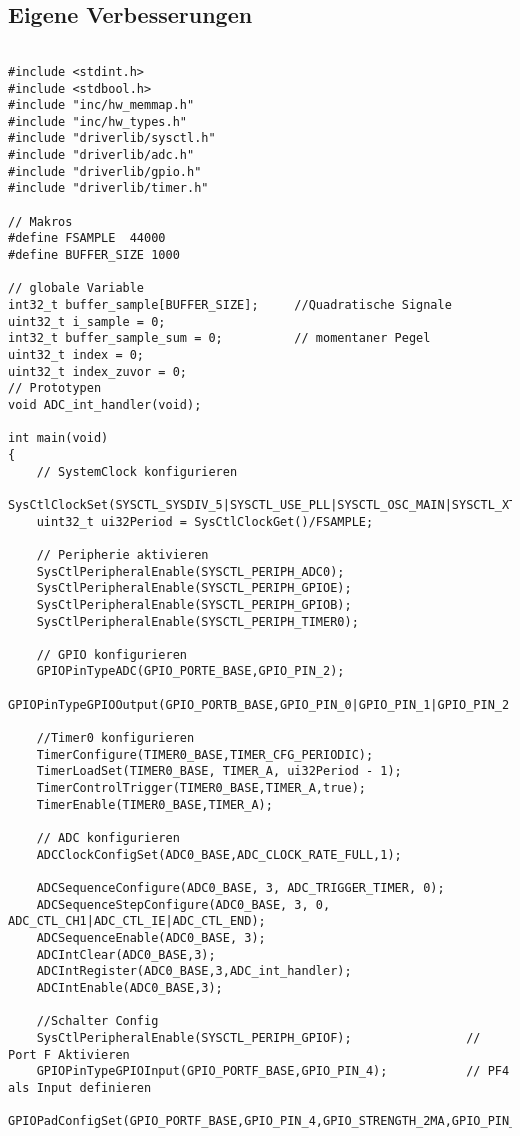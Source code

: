 \subsection{Eigene Verbesserungen}

\begin{lstlisting}

#include <stdint.h>
#include <stdbool.h>
#include "inc/hw_memmap.h"
#include "inc/hw_types.h"
#include "driverlib/sysctl.h"
#include "driverlib/adc.h"
#include "driverlib/gpio.h"
#include "driverlib/timer.h"

// Makros
#define FSAMPLE  44000
#define BUFFER_SIZE 1000

// globale Variable
int32_t buffer_sample[BUFFER_SIZE];     //Quadratische Signale
uint32_t i_sample = 0;
int32_t buffer_sample_sum = 0;          // momentaner Pegel
uint32_t index = 0;
uint32_t index_zuvor = 0;
// Prototypen
void ADC_int_handler(void);

int main(void)
{
    // SystemClock konfigurieren
    SysCtlClockSet(SYSCTL_SYSDIV_5|SYSCTL_USE_PLL|SYSCTL_OSC_MAIN|SYSCTL_XTAL_16MHZ);
    uint32_t ui32Period = SysCtlClockGet()/FSAMPLE;

    // Peripherie aktivieren
    SysCtlPeripheralEnable(SYSCTL_PERIPH_ADC0);
    SysCtlPeripheralEnable(SYSCTL_PERIPH_GPIOE);
    SysCtlPeripheralEnable(SYSCTL_PERIPH_GPIOB);
    SysCtlPeripheralEnable(SYSCTL_PERIPH_TIMER0);

    // GPIO konfigurieren
    GPIOPinTypeADC(GPIO_PORTE_BASE,GPIO_PIN_2);
    GPIOPinTypeGPIOOutput(GPIO_PORTB_BASE,GPIO_PIN_0|GPIO_PIN_1|GPIO_PIN_2|GPIO_PIN_3|GPIO_PIN_4|GPIO_PIN_5|GPIO_PIN_6|GPIO_PIN_7);

    //Timer0 konfigurieren
    TimerConfigure(TIMER0_BASE,TIMER_CFG_PERIODIC);
    TimerLoadSet(TIMER0_BASE, TIMER_A, ui32Period - 1);
    TimerControlTrigger(TIMER0_BASE,TIMER_A,true);
    TimerEnable(TIMER0_BASE,TIMER_A);

    // ADC konfigurieren
    ADCClockConfigSet(ADC0_BASE,ADC_CLOCK_RATE_FULL,1);

    ADCSequenceConfigure(ADC0_BASE, 3, ADC_TRIGGER_TIMER, 0);
    ADCSequenceStepConfigure(ADC0_BASE, 3, 0, ADC_CTL_CH1|ADC_CTL_IE|ADC_CTL_END);
    ADCSequenceEnable(ADC0_BASE, 3);
    ADCIntClear(ADC0_BASE,3);
    ADCIntRegister(ADC0_BASE,3,ADC_int_handler);
    ADCIntEnable(ADC0_BASE,3);

    //Schalter Config
    SysCtlPeripheralEnable(SYSCTL_PERIPH_GPIOF);                // Port F Aktivieren
    GPIOPinTypeGPIOInput(GPIO_PORTF_BASE,GPIO_PIN_4);           // PF4 als Input definieren
    GPIOPadConfigSet(GPIO_PORTF_BASE,GPIO_PIN_4,GPIO_STRENGTH_2MA,GPIO_PIN_TYPE_STD_WPU);


\end{lstlisting}
